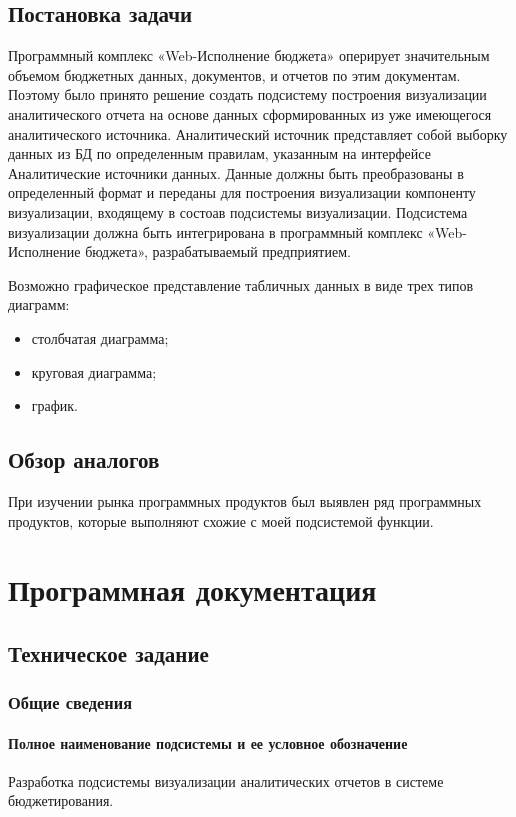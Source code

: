 \documentclass[a4paper]{extarticle}
\begin{document}
\subsection{Постановка задачи}
Программный комплекс «Web-Исполнение бюджета» оперирует значительным объемом бюджетных данных, документов, и отчетов по этим документам. Поэтому было принято решение создать подсистему построения визуализации аналитического отчета на основе данных сформированных из уже имеющегося аналитического источника. Аналитический источник представляет собой выборку данных из БД по определенным правилам, указанным на интерфейсе Аналитические источники данных. Данные должны быть преобразованы в определенный формат и переданы для построения визуализации компоненту визуализации, входящему в состоав подсистемы визуализации. Подсистема визуализации должна быть интегрирована в программный комплекс «Web-Исполнение бюджета», разрабатываемый предприятием.\par
Возможно графическое представление табличных данных в виде трех типов диаграмм:
\begin{itemize}
  \item столбчатая диаграмма;
  \item круговая диаграмма;
  \item график.
\end{itemize}\par

\subsection{Обзор аналогов}
При изучении рынка программных продуктов был выявлен ряд программных продуктов, которые выполняют схожие с моей подсистемой функции.

\section{Программная документация}

\subsection{Техническое задание}	

\subsubsection{Общие сведения}

\paragraph{Полное наименование подсистемы и ее условное обозначение}
Разработка подсистемы визуализации аналитических отчетов в системе бюджетирования.
\end{document}
